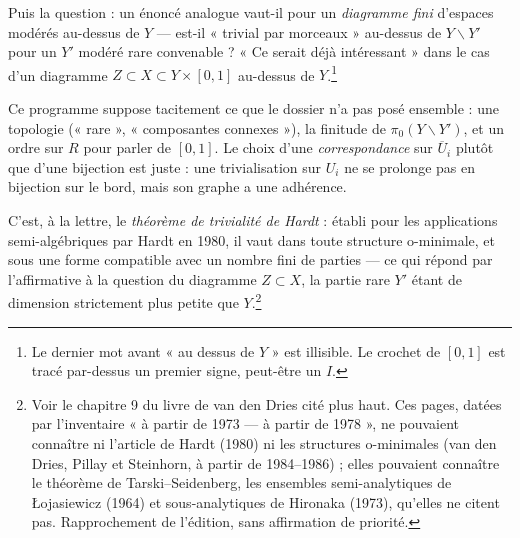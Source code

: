 \documentclass[11pt,a4paper]{article}
\begin{document}
Puis la question : un énoncé analogue vaut-il pour un \emph{diagramme fini}
d'espaces modérés au-dessus de $Y$ — est-il « trivial par morceaux »
au-dessus de $Y \smallsetminus Y'$ pour un $Y'$ modéré rare convenable ? « Ce
serait déjà intéressant » dans le cas d'un diagramme $Z \subset X \subset Y
\times [0,1]$ au-dessus de $Y$.\footnote{Le dernier mot avant « au dessus de
$Y$ » est illisible. Le crochet de $[0,1]$ est tracé par-dessus un premier
signe, peut-être un $I$.}

Ce programme suppose tacitement ce que le dossier n'a pas posé ensemble : une
topologie (« rare », « composantes connexes »), la finitude de $\pi_0(Y
\smallsetminus Y')$, et un ordre sur $R$ pour parler de $[0,1]$. Le choix
d'une \emph{correspondance} sur $\overline{U}_i$ plutôt que d'une bijection est
juste : une trivialisation sur $U_i$ ne se prolonge pas en bijection sur le
bord, mais son graphe a une adhérence.

C'est, à la lettre, le \emph{théorème de trivialité de Hardt} : établi pour les
applications semi-algébriques par Hardt en 1980, il vaut dans toute structure
o-minimale, et sous une forme compatible avec un nombre fini de parties — ce
qui répond par l'affirmative à la question du diagramme $Z \subset X$, la
partie rare $Y'$ étant de dimension strictement plus petite que
$Y$.\footnote{Voir le chapitre 9 du livre de van den Dries cité plus haut.
Ces pages, datées par l'inventaire « à partir de 1973 — à partir de 1978 »,
ne pouvaient connaître ni l'article de Hardt (1980) ni les structures
o-minimales (van den Dries, Pillay et Steinhorn, à partir de 1984–1986) ;
elles pouvaient connaître le théorème de Tarski–Seidenberg, les ensembles
semi-analytiques de Łojasiewicz (1964) et sous-analytiques de Hironaka
(1973), qu'elles ne citent pas. Rapprochement de l'édition, sans
affirmation de priorité.}
\end{document}
